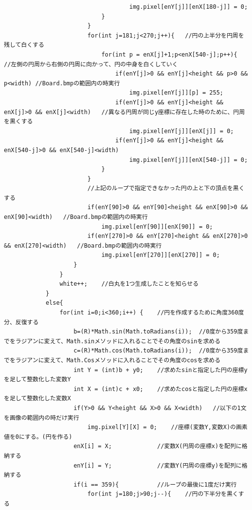 \documentclass{jsarticle}
\begin{document}
\begin{verbatim}
                                    img.pixel[enY[j]][enX[180-j]] = 0;
                            }
                        }
                        for(int j=181;j<270;j++){   //円の上半分を円周を残して白くする
                            for(int p = enX[j]+1;p<enX[540-j];p++){     //左側の円周から右側の円周に向かって、円の中身を白くしていく
                                if(enY[j]>0 && enY[j]<height && p>0 && p<width) //Board.bmpの範囲内の時実行
                                    img.pixel[enY[j]][p] = 255;
                                if(enY[j]>0 && enY[j]<height && enX[j]>0 && enX[j]<width)   //異なる円周が同じy座標に存在した時のために、円周を黒くする
                                    img.pixel[enY[j]][enX[j]] = 0;
                                if(enY[j]>0 && enY[j]<height && enX[540-j]>0 && enX[540-j]<width)
                                    img.pixel[enY[j]][enX[540-j]] = 0;
                            }
                        }
                        //上記のループで指定できなかった円の上と下の頂点を黒くする
                        if(enY[90]>0 && enY[90]<height && enX[90]>0 && enX[90]<width)   //Board.bmpの範囲内の時実行
                            img.pixel[enY[90]][enX[90]] = 0;
                        if(enY[270]>0 && enY[270]<height && enX[270]>0 && enX[270]<width)   //Board.bmpの範囲内の時実行
                            img.pixel[enY[270]][enX[270]] = 0;
                    }
                }
                white++;    //白丸を1つ生成したことを知らせる
            }
            else{
                for(int i=0;i<360;i++) {    //円を作成するために角度360度分、反復する
                    b=(R)*Math.sin(Math.toRadians(i));  //0度から359度までをラジアンに変えて、Math.sinメソッドに入れることでその角度のsinを求める
                    c=(R)*Math.cos(Math.toRadians(i));  //0度から359度までをラジアンに変えて、Math.Cosメソッドに入れることでその角度のcosを求める
                    int Y = (int)b + y0;    //求めたsinと指定した円の座標yを足して整数化した変数Y
                    int X = (int)c + x0;    //求めたcosと指定した円の座標xを足して整数化した変数X
                    if(Y>0 && Y<height && X>0 && X<width)   //以下の1文を画像の範囲内の時だけ実行
                        img.pixel[Y][X] = 0;    //座標(変数Y,変数X)の画素値を0にする。(円を作る)
                    enX[i] = X;             //変数X(円周の座標x)を配列に格納する
                    enY[i] = Y;             //変数Y(円周の座標y)を配列に格納する
                    if(i == 359){           //ループの最後に1度だけ実行
                        for(int j=180;j>90;j--){    //円の下半分を黒くする

\end{verbatim}
\end{document}
